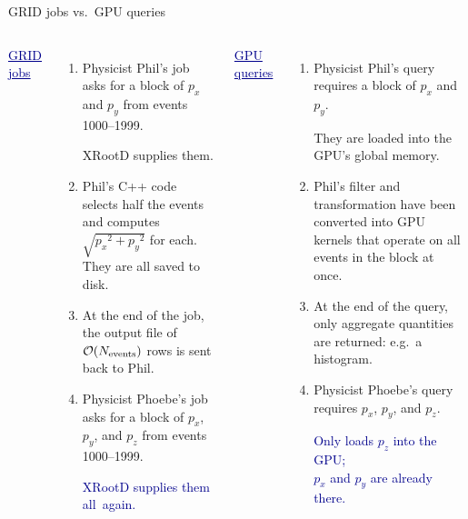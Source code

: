 \documentclass{beamer}
\begin{document}
\begin{frame}{GRID jobs vs.\ GPU queries}
\vspace{0.25 cm}
\small
\begin{columns}[t]
\textcolor{darkblue}{\underline{GRID jobs}}
\begin{enumerate}
\item Physicist Phil's job asks for a block of $p_x$ and $p_y$ from events 1000--1999.

XRootD supplies them.

\item Phil's C++ code selects half the events and computes $\sqrt{{p_x}^2 + {p_y}^2}$ for each. They are all saved to disk.

\item At the end of the job, the output file of $\mathcal{O}(N_{\mbox{\scriptsize events}})$ rows is sent back to Phil.

\item Physicist Phoebe's job asks for a block of $p_x$, $p_y$, and $p_z$ from events 1000--1999.

\textcolor{darkblue}{XRootD supplies them \mbox{all again.\hspace{-1 cm}}}
\end{enumerate}

\textcolor{darkblue}{\underline{GPU queries}}
\begin{enumerate}
\item Physicist Phil's query requires a block of $p_x$ and $p_y$.

They are loaded into the GPU's global memory.

\item Phil's filter and transformation have been converted into GPU kernels that operate on all events in the block at once.

\item At the end of the query, only aggregate quantities are returned: e.g.\ a histogram.

\item Physicist Phoebe's query requires $p_x$, $p_y$, and $p_z$.

\textcolor{darkblue}{Only loads $p_z$ into the GPU; \\ $p_x$ and $p_y$ are already there.}
\end{enumerate}
\end{columns}
\end{frame}
\end{document}
